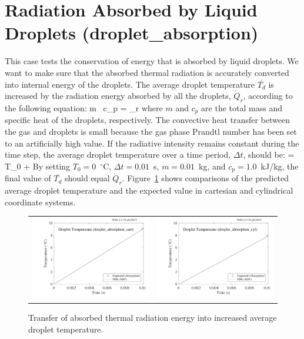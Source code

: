 \documentclass[11pt]{book}
\begin{document}
\clearpage

\section{Radiation Absorbed by Liquid Droplets (\texorpdfstring{{\bf droplet\_absorption}}{droplet\_absorption}) }
\label{droplet_absorption}

This case tests the conservation of energy that is absorbed by liquid droplets. We want to make sure that the
absorbed thermal radiation is accurately converted into internal energy of the droplets. The average droplet temperature $\overline{T_d}$ is
increased by the radiation energy absorbed by all the droplets, $\dot{Q}_r$, according to the following equation:
\be
m \, c_p  = _r
\ee
where $m$ and $c_p$ are the total mass and specific heat of the droplets, respectively. The convective heat transfer between the
gas and droplets is small because the gas phase Prandtl number has been set to an artificially high value.
If the radiative intensity remains constant during the time step, the average droplet temperature over a time period, $\Delta t$, should be:
\be
{} = T_0 + 
\ee
By setting $T_0=0$~$^\circ$C, $\Delta t =0.01$~s, $m =0.01$~kg, and $c_p =1.0$~kJ/kg, the final value of $\overline{T_d}$ should equal
$\dot{Q}_r$. Figure~\ref{droplet_absorption_figures} shows comparisons of the predicted average droplet temperature and the expected value in cartesian and cylindrical
coordinate systems.

\begin{figure}[h]
\noindent
\begin{tabular*}{\textwidth}{l@{\extracolsep{\fill}}r}
\includegraphics[width=3.2in]{SCRIPT_FIGURES/droplet_absorption_cart} &
\includegraphics[width=3.2in]{SCRIPT_FIGURES/droplet_absorption_cyl}
\end{tabular*}
\caption[Radiation absorption by liquid droplets]{Transfer of absorbed thermal radiation energy into increased average droplet temperature.}
\label{droplet_absorption_figures}
\end{figure}
\end{document}
